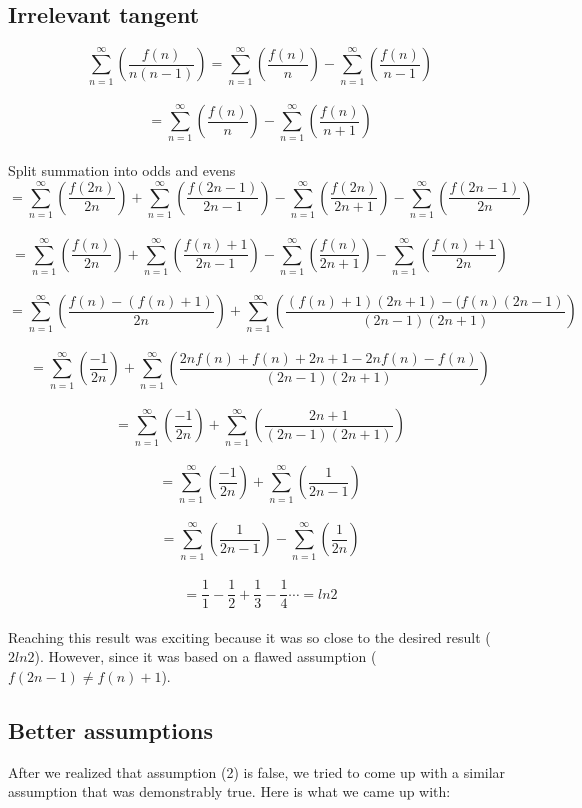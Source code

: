 \documentclass{article}
\begin{document}
\subsection{Irrelevant tangent}
$$\sum_{n=1}^\infty \left( \frac{f(n)}{n(n-1)} \right)=\sum_{n=1}^\infty \left( \frac{f(n)}{n} \right)-\sum_{n=1}^\infty \left( \frac{f(n)}{n-1} \right)$$\\
$$=\sum_{n=1}^\infty \left( \frac{f(n)}{n} \right)-\sum_{n=1}^\infty \left( \frac{f(n)}{n+1} \right)$$\\
Split summation into odds and evens
$$=\sum_{n=1}^\infty \left( \frac{f(2n)}{2n} \right)+\sum_{n=1}^\infty \left( \frac{f(2n-1)}{2n-1} \right)
-\sum_{n=1}^\infty \left( \frac{f(2n)}{2n+1} \right)-\sum_{n=1}^\infty \left( \frac{f(2n-1)}{2n} \right)$$\\
$$=\sum_{n=1}^\infty \left( \frac{f(n)}{2n} \right)+\sum_{n=1}^\infty \left( \frac{f(n)+1}{2n-1} \right)
-\sum_{n=1}^\infty \left( \frac{f(n)}{2n+1} \right)-\sum_{n=1}^\infty \left( \frac{f(n)+1}{2n} \right)$$\\
$$=\sum_{n=1}^\infty \left( \frac{f(n)-(f(n)+1)}{2n} \right)
+\sum_{n=1}^\infty \left( \frac{(f(n)+1)(2n+1)-(f(n)(2n-1)}{(2n-1)(2n+1)} \right)$$\\
$$=\sum_{n=1}^\infty \left( \frac{-1}{2n} \right)
+\sum_{n=1}^\infty \left( \frac{2nf(n)+f(n)+2n+1-2nf(n)-f(n)}{(2n-1)(2n+1)} \right)$$\\
$$=\sum_{n=1}^\infty \left( \frac{-1}{2n} \right)
+\sum_{n=1}^\infty \left( \frac{2n+1}{(2n-1)(2n+1)} \right)$$\\
$$=\sum_{n=1}^\infty \left( \frac{-1}{2n} \right)
+\sum_{n=1}^\infty \left( \frac{1}{2n-1} \right)$$\\
$$=\sum_{n=1}^\infty \left( \frac{1}{2n-1} \right)
-\sum_{n=1}^\infty \left( \frac{1}{2n} \right)$$\\
$$=\frac{1}{1} - \frac{1}{2} + \frac{1}{3} - \frac{1}{4} \cdots = ln2$$\\
Reaching this result was exciting because it was so close to the desired result ($2ln2$). However, since it was based on a flawed assumption ($f(2n-1) \neq f(n) + 1$).

\subsection{Better assumptions}
After we realized that assumption (2) is false, we tried to come up with a similar assumption that was demonstrably true. Here is what we came up with:\\
\end{document}

